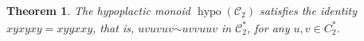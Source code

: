 \documentclass[a4paper,reqno]{amsart}
\numberwithin{equation}{section}
\theoremstyle{plain}
\newtheorem{thm}{Theorem}[section]
\theoremstyle{definition}
\newtheorem{exa}[thm]{Example}
\theoremstyle{remark}
\newcommand*{\avoidrefbreak}{\nolinebreak[3] }   %
\newcommand*{\comboref}[3][]{%
  \ifdefined\hyperref%
    \if\relax\detokenize{#1}\relax%
      \hyperref[#3]{#2\avoidrefbreak \textup{\ref*{#3}}}%
    \else%
      \hyperref[#1]{#2\avoidrefbreak \textup{\ref*{#3}(\ref*{#1})}}%
    \fi%
  \else%
    \if\relax\detokenize{#1}\relax%
      #2\avoidrefbreak \textup{\ref{#3}}%
    \else%
      #2\avoidrefbreak \textup{\ref{#3}(\ref{#1})}%
    \fi%
  \fi%
}
\newcommand*{\wbar}[1]{\overline{#1}}  %
\newcommand*{\qcrst}[1]{\mathcal{#1}}
\newcommand*{\qctC}{\qcrst{C}}
\newcommand*{\fqcms}{{\ddot{*}}}      %
\DeclareMathOperator{\hypo}{hypo}
\newcommand*{\hyco}{\mathrel{\ddot{\sim}}}
\begin{document}
%
%
%


\begin{thm}
The hypoplactic monoid $\hypo (\qctC_2)$ satisfies the identity $xyxyxy = xyyxxy$,
that is, $uvuvuv \hyco uvvuuv$ in $\qctC_2^\fqcms$, for any $u, v \in C_2^*$.
\end{thm}
\end{document}
